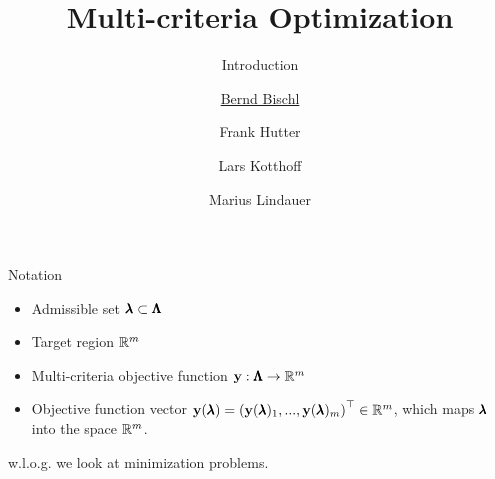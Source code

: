 

\newcommand{\a}[0]{\mathbf{a}}
\newcommand{\cost}[0]{\mathbf{y}}
\newcommand{\q}[0]{\mathbf{q}}

\title[AutoML: Overview]{Multi-criteria Optimization}
\subtitle{Introduction}
\author[Bernd Bischl]{\underline{Bernd Bischl} \and Frank Hutter \and Lars Kotthoff \and Marius Lindauer}
\institute{}
\date{}






	\maketitle


\begin{frame}{Notation}

\begin{itemize}
\item Admissible set $\pmb{\lambda} \subset \pmb{\Lambda}$
\item Target region $\mathbb{R}^m$
\item Multi-criteria objective function $\cost: \pcs \to \realnum^m$
\item Objective function vector $\cost(\conf) = \left(\cost(\conf)_1, ..., \cost(\conf)_m\right)^\top \in \realnum^m$, which maps $\pmb{\lambda}$ into the space $\mathbb{R}^m$.
\end{itemize}

w.l.o.g. we look at minimization problems.

\end{frame}

